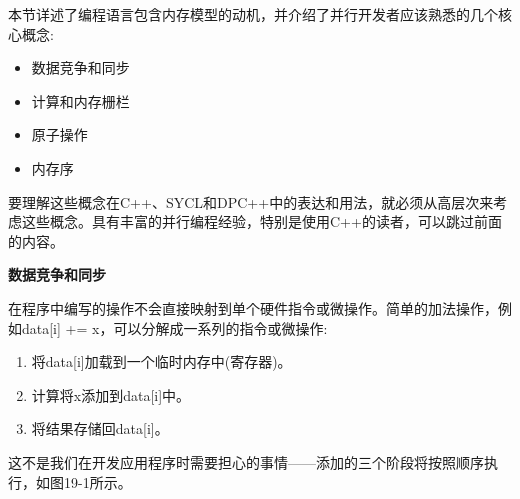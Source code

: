 本节详述了编程语言包含内存模型的动机，并介绍了并行开发者应该熟悉的几个核心概念:\par

\begin{itemize}
	\item 数据竞争和同步
	\item 计算和内存栅栏
	\item 原子操作
	\item 内存序
\end{itemize}

要理解这些概念在C++、SYCL和DPC++中的表达和用法，就必须从高层次来考虑这些概念。具有丰富的并行编程经验，特别是使用C++的读者，可以跳过前面的内容。\par

\hspace*{\fill} \par %
\textbf{数据竞争和同步}

在程序中编写的操作不会直接映射到单个硬件指令或微操作。简单的加法操作，例如data[i] += x，可以分解成一系列的指令或微操作:\par

\begin{enumerate}
	\item 将data[i]加载到一个临时内存中(寄存器)。
	\item 计算将x添加到data[i]中。
	\item 将结果存储回data[i]。
\end{enumerate}

这不是我们在开发应用程序时需要担心的事情——添加的三个阶段将按照顺序执行，如图19-1所示。\par

